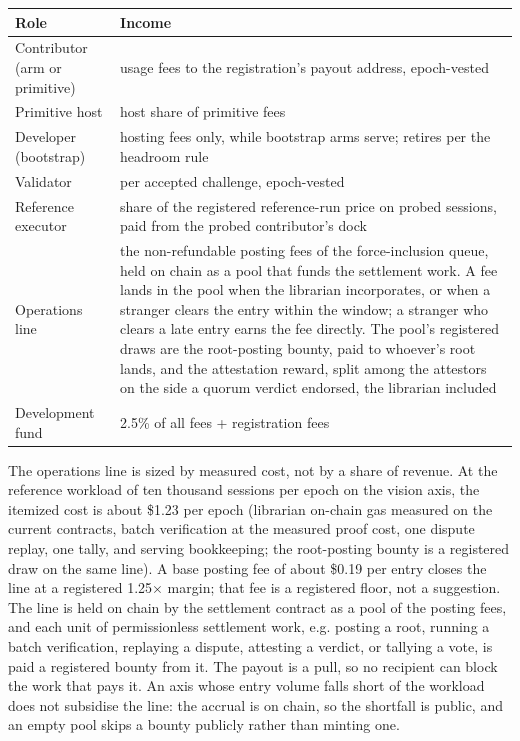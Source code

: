 \documentclass[11pt]{article}
\begin{document}
\begin{center}
    \begin{tabular}{@{}p{4.8cm}p{9.4cm}@{}}
        \toprule
        \textbf{Role}                  & \textbf{Income}                             \\
        \midrule
        Contributor (arm or primitive) & usage fees to the registration's
        payout address, epoch-vested                                                 \\
        Primitive host                 & host share of primitive fees                \\
        Developer (bootstrap)          & hosting fees only, while bootstrap arms
        serve; retires per the headroom rule                                         \\
        Validator                      & per accepted challenge, epoch-vested        \\
        Reference executor             & share of the registered reference-run price
        on probed sessions, paid from the probed contributor's dock                  \\
        Operations line                & the non-refundable posting fees of the
        force-inclusion queue, held on chain as a pool that funds the
        settlement work. A fee lands in the pool when the librarian
        incorporates, or when a stranger clears the entry within the
        window; a stranger who clears a late entry earns the fee
        directly. The pool's registered draws are the root-posting
        bounty, paid to whoever's root lands, and the attestation
        reward, split among the attestors on the side a quorum verdict
        endorsed, the librarian included                                             \\
        Development fund               & 2.5\% of all fees + registration fees       \\
        \bottomrule
    \end{tabular}
\end{center}

The operations line is sized by measured cost, not by a share of
revenue. At the reference workload of ten thousand sessions per
epoch on the vision axis, the itemized cost is about
\$1.23 per epoch (librarian on-chain gas measured on the current
contracts, batch verification at the measured proof cost, one
dispute replay, one tally, and serving bookkeeping; the
root-posting bounty is a registered draw on the same line). A
base posting fee of about \$0.19 per entry closes the line at a
registered 1.25$\times$ margin; that fee is a registered floor,
not a suggestion. The line is held on chain by the settlement
contract as a pool of the posting fees, and each unit of
permissionless settlement work, e.g. posting a root, running a
batch verification, replaying a dispute, attesting a verdict, or
tallying a vote, is
paid a registered bounty from it. The payout is a pull, so no
recipient can block the work that pays it. An axis whose entry
volume falls short of the workload does not subsidise the line:
the accrual is on chain, so the shortfall is public, and an empty
pool skips a bounty publicly rather than minting one.
\end{document}
